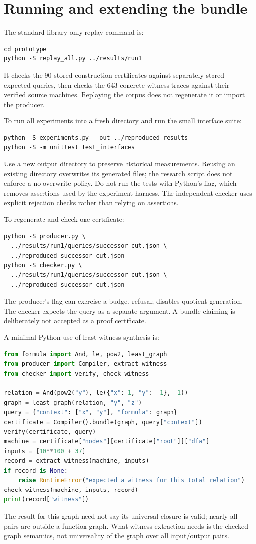 \appendix
\section{Running and extending the bundle}\label{sec:running}

The standard-library-only replay command is:
\begin{lstlisting}
cd prototype
python -S replay_all.py ../results/run1
\end{lstlisting}
It checks the 90 stored construction certificates against separately stored expected queries, then checks the 643 concrete witness traces against their verified source machines. Replaying the corpus does not regenerate it or import the producer.

To run all experiments into a fresh directory and run the small interface suite:
\begin{lstlisting}
python -S experiments.py --out ../reproduced-results
python -S -m unittest test_interfaces
\end{lstlisting}
Use a new output directory to preserve historical measurements. Reusing an existing directory overwrites its generated files; the research script does not enforce a no-overwrite policy. Do not run the tests with Python's  flag, which removes assertions used by the experiment harness. The independent checker uses explicit rejection checks rather than relying on assertions.

To regenerate and check one certificate:
\begin{lstlisting}
python -S producer.py \
  ../results/run1/queries/successor_cut.json \
  ../reproduced-successor-cut.json
python -S checker.py \
  ../results/run1/queries/successor_cut.json \
  ../reproduced-successor-cut.json
\end{lstlisting}
The producer's  flag can exercise a budget refusal;  disables quotient generation. The checker expects the query as a separate argument. A bundle claiming  is deliberately not accepted as a proof certificate.

A minimal Python use of least-witness synthesis is:
\begin{lstlisting}[language=Python]
from formula import And, le, pow2, least_graph
from producer import Compiler, extract_witness
from checker import verify, check_witness

relation = And(pow2("y"), le({"x": 1, "y": -1}, -1))
graph = least_graph(relation, "y", "z")
query = {"context": ["x", "y"], "formula": graph}
certificate = Compiler().bundle(graph, query["context"])
verify(certificate, query)
machine = certificate["nodes"][certificate["root"]]["dfa"]
inputs = [10**100 + 37]
record = extract_witness(machine, inputs)
if record is None:
    raise RuntimeError("expected a witness for this total relation")
check_witness(machine, inputs, record)
print(record["witness"])
\end{lstlisting}
The \code{verify} result for this graph need not say its universal closure is valid; nearly all pairs are outside a function graph. What witness extraction needs is the checked graph semantics, not universality of the graph over all input/output pairs.

